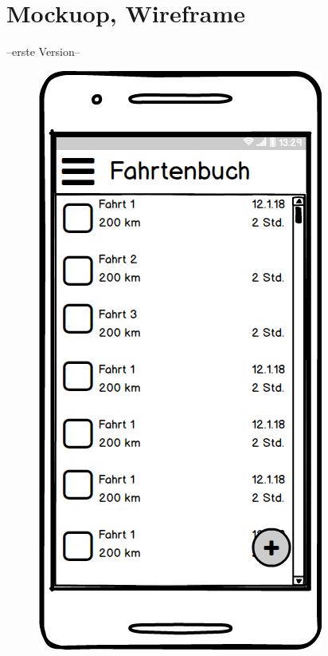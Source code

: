 \documentclass[a4paper]{article}
\begin{document}
\section{Mockuop, Wireframe}
--erste Version--

\begin{figure}
	\begin{minipage}[b]{0.3\textwidth}
        \includegraphics[width=\textwidth]{img/mock1}

\end{minipage}
\end{figure}
\end{document}

